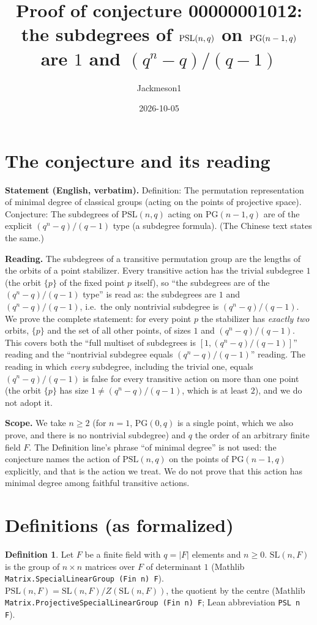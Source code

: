 \documentclass[11pt]{article}
\title{Proof of conjecture 00000001012:\\ the subdegrees of $\PSL(n,q)$ on $\PG(n-1,q)$ are $1$ and $(q^n-q)/(q-1)$}
\author{Jackmeson1}
\date{2026-10-05}
\theoremstyle{definition}
\newtheorem{definition}[theorem]{Definition}
\newcommand{\PSL}{\mathrm{PSL}}
\newcommand{\SL}{\mathrm{SL}}
\newcommand{\PG}{\mathrm{PG}}
\begin{document}
\maketitle

\section{The conjecture and its reading}

\textbf{Statement (English, verbatim).} Definition: The permutation representation of minimal
degree of classical groups (acting on the points of projective space). Conjecture: The subdegrees
of $\PSL(n,q)$ acting on $\PG(n-1,q)$ are of the explicit $(q^n-q)/(q-1)$ type (a subdegree
formula). (The Chinese text states the same.)

\textbf{Reading.} The subdegrees of a transitive permutation group are the lengths of the orbits
of a point stabilizer. Every transitive action has the trivial subdegree $1$ (the orbit $\{p\}$ of
the fixed point $p$ itself), so ``the subdegrees are of the $(q^n-q)/(q-1)$ type'' is read as: the
subdegrees are $1$ and $(q^n-q)/(q-1)$, i.e.\ the only nontrivial subdegree is $(q^n-q)/(q-1)$.
We prove the complete statement: for every point $p$ the stabilizer has \emph{exactly two}
orbits, $\{p\}$ and the set of all other points, of sizes $1$ and $(q^n-q)/(q-1)$. This covers both
the ``full multiset of subdegrees is $[1,(q^n-q)/(q-1)]$'' reading and the ``nontrivial subdegree
equals $(q^n-q)/(q-1)$'' reading. The reading in which \emph{every} subdegree, including the
trivial one, equals $(q^n-q)/(q-1)$ is false for every transitive action on more than one point
(the orbit $\{p\}$ has size $1\neq(q^n-q)/(q-1)$, which is at least $2$), and we do not adopt it.

\textbf{Scope.} We take $n\ge 2$ (for $n=1$, $\PG(0,q)$ is a single point, which we also prove,
and there is no nontrivial subdegree) and $q$ the order of an arbitrary finite field $F$. The
Definition line's phrase ``of minimal degree'' is not used: the conjecture names the action of
$\PSL(n,q)$ on the points of $\PG(n-1,q)$ explicitly, and that is the action we treat. We do not
prove that this action has minimal degree among faithful transitive actions.

\section{Definitions (as formalized)}

\begin{definition}
Let $F$ be a finite field with $q=|F|$ elements and $n\ge 0$. $\SL(n,F)$ is the group of
$n\times n$ matrices over $F$ of determinant $1$ (Mathlib \texttt{Matrix.SpecialLinearGroup (Fin n) F}).
$\PSL(n,F)=\SL(n,F)/Z(\SL(n,F))$, the quotient by the centre (Mathlib
\texttt{Matrix.ProjectiveSpecialLinearGroup (Fin n) F}; Lean abbreviation \texttt{PSL n F}).
\end{definition}
\end{document}
